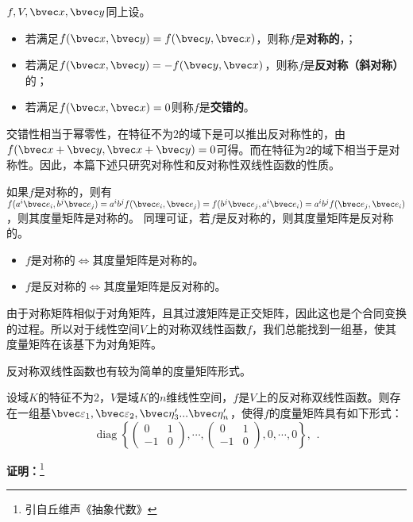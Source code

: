 \begin{definition}{}
$f,V,\bvec x,\bvec y$同上设。
\begin{itemize}
\item 若满足$f(\bvec x,\bvec y)=f(\bvec y,\bvec x)$，则称$f$是\textbf{对称的}，；
\item 若满足$f(\bvec x,\bvec y)=-f(\bvec y,\bvec x)$，则称$f$是\textbf{反对称（斜对称）}的；
\item 若满足$f(\bvec x,\bvec x)=0$则称$f$是\textbf{交错的}。
\end{itemize}
\end{definition}
交错性相当于幂零性，在特征不为$2$的域下是可以推出反对称性的，由$f(\bvec x+\bvec y,\bvec x+\bvec y)=0$可得。而在特征为$2$的域下相当于是对称性。因此，本篇下述只研究对称性和反对称性双线性函数的性质。

如果$f$是对称的，则有$f(a^i\bvec e_i,b^j\bvec e_j)=a^ib^jf(\bvec e_i,\bvec e_j)=f(b^j\bvec e_j,a^i\bvec e_i)=a^ib^jf(\bvec e_j,\bvec e_i)$，则其度量矩阵是对称的。
同理可证，若$f$是反对称的，则其度量矩阵是反对称的。
\begin{itemize}
\item $f$是对称的$\Leftrightarrow$其度量矩阵是对称的。
\item $f$是反对称的$\Leftrightarrow$其度量矩阵是反对称的。
\end{itemize}

由于对称矩阵相似于对角矩阵，且其过渡矩阵是正交矩阵，因此这也是个合同变换的过程。所以对于线性空间$V$上的对称双线性函数$f$，我们总能找到一组基，使其度量矩阵在该基下为对角矩阵。

反对称双线性函数也有较为简单的度量矩阵形式。
\begin{theorem}{}
设域$K$的特征不为$2$，$V$是域$K$的$n$维线性空间，$f$是$V$上的反对称双线性函数。则存在一组基$\bvec \varepsilon_1,\bvec \varepsilon_2,\bvec \eta'_3...\bvec \eta'_n$，使得$f$的度量矩阵具有如下形式：
\begin{equation}
\operatorname{diag}\left\{\left(\begin{array}{rr}
0 & 1 \\
-1 & 0
\end{array}\right), \cdots,\left(\begin{array}{rr}
0 & 1 \\
-1 & 0
\end{array}\right), 0, \cdots, 0\right\} \text {, }
~.\end{equation}
\end{theorem}
\textbf{证明：}\footnote{引自丘维声《抽象代数》}

